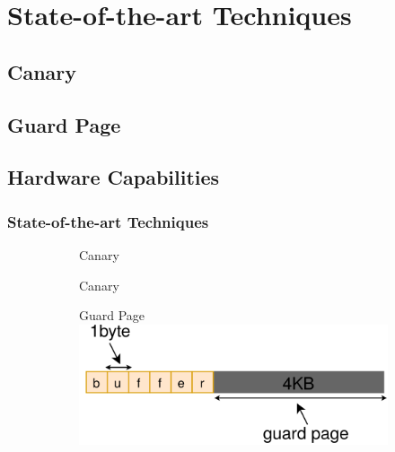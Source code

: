 \documentclass[xcolor=table,bigger,unknownkeysallowed]{beamer}
\begin{document}
\section{State-of-the-art Techniques}
\subsection{Canary}
\subsection{Guard Page}
\subsection{Hardware Capabilities}
\begin{frame}
\frametitle{State-of-the-art Techniques} 

\begin{overprint}

	\begin{figure}
		\begin{subfigure}{.48\linewidth}
			 Canary\\
		\end{subfigure}
	\end{figure}
	

	\begin{figure}
		\centering
		\begin{subfigure}{.48\linewidth}
			\centering
			 Canary\\
		\end{subfigure}
		\begin{subfigure}{.48\linewidth}	
			\centering
			 Guard Page\\
			\includegraphics[width=.7\columnwidth]{fig/gp.png}
		\end{subfigure}
	\end{figure}


\end{overprint}
\end{frame}
\end{document}
